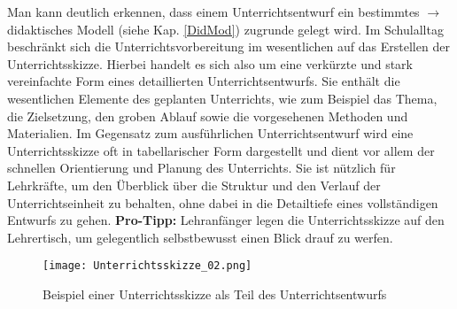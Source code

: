 \bip
Man kann deutlich erkennen, dass einem Unterrichtsentwurf ein bestimmtes $\to$ didaktisches Modell (siehe Kap. \ref{DidMod}) zugrunde gelegt wird.
\mip
Im Schulalltag beschr\"{a}nkt sich  die Unterrichtsvorbereitung im wesentlichen auf das Erstellen der Unterrichtsskizze. Hierbei handelt es sich also um eine verk\"{u}rzte und stark vereinfachte Form eines detaillierten Unterrichtsentwurfs. Sie enth\"{a}lt die wesentlichen Elemente des geplanten Unterrichts, wie zum Beispiel das Thema, die Zielsetzung, den groben Ablauf sowie die vorgesehenen Methoden und Materialien. Im Gegensatz zum ausf\"{u}hrlichen Unterrichtsentwurf wird eine Unterrichtsskizze oft in tabellarischer Form dargestellt und dient vor allem der schnellen Orientierung und Planung des Unterrichts. Sie ist n\"{u}tzlich f\"{u}r Lehrkr\"{a}fte, um den \"{U}berblick \"{u}ber die Struktur und den Verlauf der Unterrichtseinheit zu behalten, ohne dabei in die Detailtiefe eines vollst\"{a}ndigen Entwurfs zu gehen.
\bip
\textbf{Pro-Tipp:} Lehranf\"{a}nger legen die Unterrichtsskizze auf den Lehrertisch, um gelegentlich selbstbewusst einen Blick drauf zu werfen.
\bip

\begin{figure}
	\texttt{[image: Unterrichtsskizze\_02.png]}
	\caption{Beispiel einer Unterrichtsskizze als Teil des Unterrichtsentwurfs}
	\label{fig:Unterrichtsskizze}
\end{figure}
